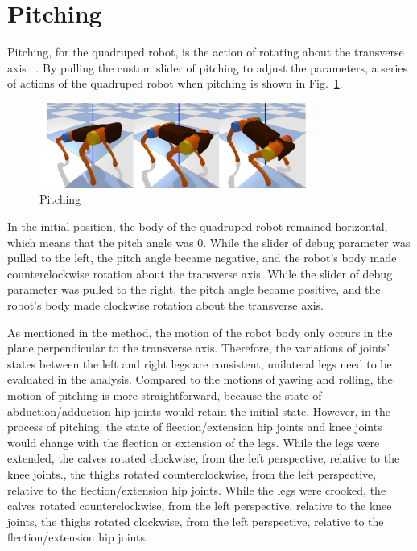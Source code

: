 \section{Pitching}

Pitching, for the quadruped robot, is the action of rotating about the transverse axis ~\cite{ref:6DOF}. By pulling the custom slider of pitching to adjust the parameters, a series of actions of the quadruped robot when pitching is shown in Fig.~\ref{fig: pitching}.

\begin{figure}[htbp]
    \centering
    \includegraphics[width=0.8\textwidth]{figures/pitching.png}
    \caption{Pitching}
    \label{fig: pitching}
\end{figure}

In the initial position, the body of the quadruped robot remained horizontal, which means that the pitch angle was 0. While the slider of debug parameter was pulled to the left, the pitch angle became negative, and the robot's body made counterclockwise rotation about the transverse axis. While the slider of debug parameter was pulled to the right, the pitch angle became positive, and the robot's body made clockwise rotation about the transverse axis.

As mentioned in the method, the motion of the robot body only occurs in the plane perpendicular to the transverse axis. Therefore, the variations of joints' states between the left and right legs are consistent, unilateral legs need to be evaluated in the analysis. Compared to the motions of yawing and rolling, the motion of pitching is more straightforward, because the state of abduction/adduction hip joints would retain the initial state. However, in the process of pitching, the state of flection/extension hip joints and knee joints would change with the flection or extension of the legs. While the legs were extended, the calves rotated clockwise, from the left perspective, relative to the knee joints., the thighs rotated counterclockwise, from the left perspective, relative to the flection/extension hip joints. While the legs were crooked, the calves rotated counterclockwise, from the left perspective, relative to the knee joints, the thighs rotated clockwise, from the left perspective, relative to the flection/extension hip joints.


